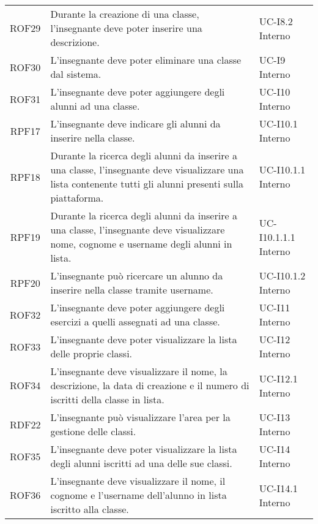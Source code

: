 \begin{tabularx}{\textwidth}{| c | p{10cm} | X |}
		ROF29 & Durante la creazione di una classe, l'insegnante deve poter inserire una descrizione. & UC-I8.2 \newline Interno\\
		ROF30 & L'insegnante deve poter eliminare una classe dal sistema. & UC-I9 \newline Interno\\
		ROF31 & L'insegnante deve poter aggiungere degli alunni ad una classe. & UC-I10 \newline Interno\\
		RPF17 & L'insegnante deve indicare gli alunni da inserire nella classe. & UC-I10.1 \newline Interno\\
		RPF18 & Durante la ricerca degli alunni da inserire a una classe, l'insegnante deve visualizzare una lista contenente tutti gli alunni presenti sulla piattaforma. & UC-I10.1.1 \newline Interno\\
		RPF19 & Durante la ricerca degli alunni da inserire a una classe, l'insegnante deve visualizzare nome, cognome e username degli alunni in lista. & UC-I10.1.1.1 \newline Interno\\
		RPF20 & L'insegnante può ricercare un alunno da inserire nella classe tramite username. & UC-I10.1.2 \newline Interno\\
		ROF32 & L'insegnante deve poter aggiungere degli esercizi a quelli assegnati ad una classe. & UC-I11 \newline Interno\\
		ROF33 & L'insegnante deve poter visualizzare la lista delle proprie classi. & UC-I12 \newline Interno\\
		ROF34 & L'insegnante deve visualizzare il nome, la descrizione, la data di creazione e il numero di iscritti della classe in lista. & UC-I12.1 \newline Interno\\
		RDF22 & L'insegnante può visualizzare l'area per la gestione delle classi. & UC-I13 \newline Interno\\
		ROF35 & L'insegnante deve poter visualizzare la lista degli alunni iscritti ad una delle sue classi. & UC-I14 \newline Interno\\		
		ROF36 & L'insegnante deve visualizzare il nome, il cognome e l'username dell'alunno in lista iscritto alla classe. & UC-I14.1 \newline Interno\\

\end{tabularx}
